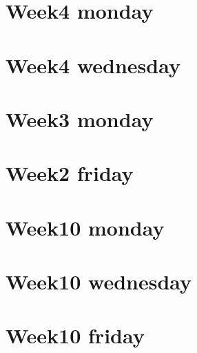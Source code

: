 
\section*{Week4 monday}

\vfill
\section*{Week4 wednesday}

\vfill
\section*{Week3 monday}

\vfill
\section*{Week2 friday}

\vfill
\section*{Week10 monday}

\vfill
\section*{Week10 wednesday}

\vfill
\section*{Week10 friday}

\vfill
